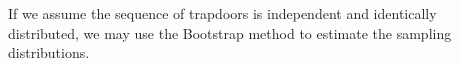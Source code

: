 If we assume the sequence of trapdoors is independent and identically distributed, we may use the Bootstrap method\cite{ref16} to estimate the sampling distributions.














